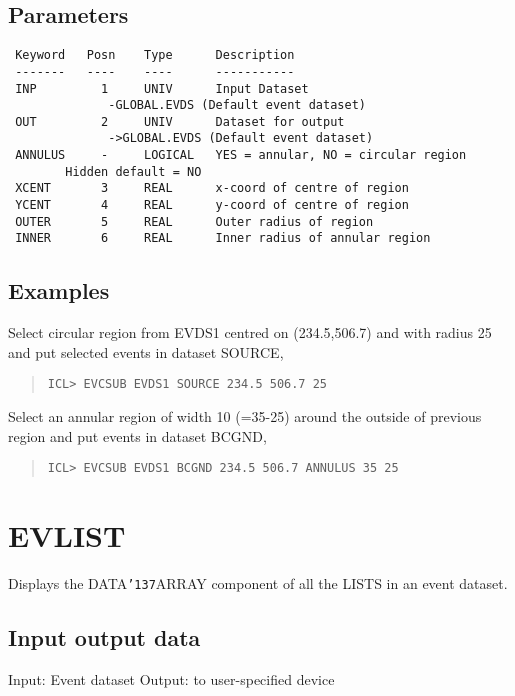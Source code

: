 \documentclass{book}
\renewcommand{\_}{{\tt\char'137}}     %
\begin{document}
\subsection{Parameters}
\begin{verbatim}
 Keyword   Posn    Type      Description
 -------   ----    ----      -----------
 INP         1     UNIV      Input Dataset
              -GLOBAL.EVDS (Default event dataset)
 OUT         2     UNIV      Dataset for output
              ->GLOBAL.EVDS (Default event dataset)
 ANNULUS     -     LOGICAL   YES = annular, NO = circular region
        Hidden default = NO
 XCENT       3     REAL      x-coord of centre of region
 YCENT       4     REAL      y-coord of centre of region
 OUTER       5     REAL      Outer radius of region
 INNER       6     REAL      Inner radius of annular region

\end{verbatim}\subsection{Examples}
Select circular region from EVDS1 centred on
(234.5,506.7) and with radius 25 and put selected
events in dataset SOURCE,
\begin{quote}\begin{verbatim}
ICL> EVCSUB EVDS1 SOURCE 234.5 506.7 25
\end{verbatim}\end{quote}
Select an annular region of width 10 (=35-25)
around the outside of previous region and put
events in dataset BCGND,
\begin{quote}\begin{verbatim}
ICL> EVCSUB EVDS1 BCGND 234.5 506.7 ANNULUS 35 25
\end{verbatim}\end{quote}
\section{EVLIST}
Displays the DATA\_ARRAY component of all the LISTS in an event
dataset.

\subsection{Input output data}
Input: Event dataset
Output: to user-specified device
\end{document}
